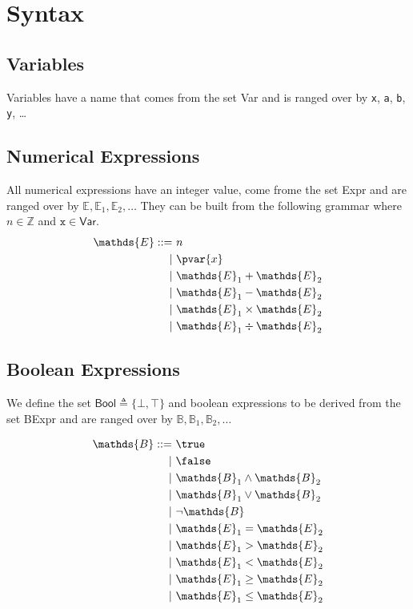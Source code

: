 \section{Syntax}

\subsection{Variables}

Variables have a name that comes from the set \textsf{Var} and is ranged over by \texttt{x}, \texttt{a}, \texttt{b}, \texttt{y}, \ldots

\subsection{Numerical Expressions}

All numerical expressions have an integer value, come frome the set \textsf{Expr} and are ranged over by $\mathds{E}, \mathds{E}_1, \mathds{E}_2, \ldots$ They can be built from the following grammar where $n \in \mathds{Z}$ and $\mathtt{x} \in \mathsf{Var}$.
\begin{align*}
\mathds{E} ::=&
\ n \\
|&\ \pvar{x} \\
|&\ \mathds{E}_1 + \mathds{E}_2 \\
|&\ \mathds{E}_1 - \mathds{E}_2 \\
|&\ \mathds{E}_1 \times \mathds{E}_2 \\
|&\ \mathds{E}_1 \div \mathds{E}_2 \\
\end{align*}

\subsection{Boolean Expressions}

We define the set $\mathsf{Bool} \triangleq \{ \bot, \top \}$ and boolean expressions to be derived from the set \textsf{BExpr} and are ranged over by $\mathds{B}, \mathds{B}_1, \mathds{B}_2, \ldots$

\begin{align*}
\mathds{B} ::=&
\ \true \\
|&\ \false \\
|&\ \mathds{B}_1 \land \mathds{B}_2 \\
|&\ \mathds{B}_1 \lor \mathds{B}_2 \\
|&\ \lnot \mathds{B} \\
|&\ \mathds{E}_1 = \mathds{E}_2 \\
|&\ \mathds{E}_1 > \mathds{E}_2 \\
|&\ \mathds{E}_1 < \mathds{E}_2 \\
|&\ \mathds{E}_1 \geq \mathds{E}_2 \\
|&\ \mathds{E}_1 \leq \mathds{E}_2 \\
\end{align*}

